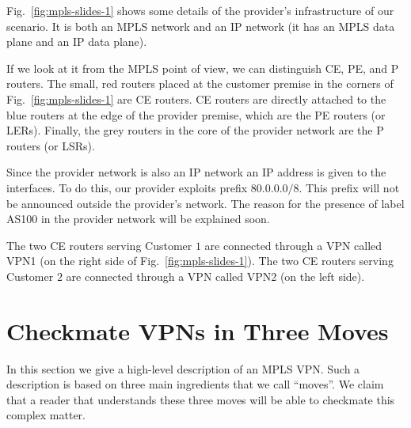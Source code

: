 \documentclass{article}
\begin{document}
\begin{shaded}
\noindent
Fig.~\ref{fig:mpls-slides-1} shows some details of the provider's infrastructure of our
scenario. It is
both an MPLS network and an IP network (it has an MPLS data plane and an IP data
plane).

If we look at it from the MPLS point of view, we can distinguish CE, PE, and P 
routers. The small, red routers placed at the customer premise in the corners 
of Fig.~\ref{fig:mpls-slides-1} are CE routers. CE routers are directly 
attached to the blue routers at the edge of the provider premise, which are the 
PE routers (or LERs). Finally, the grey routers in the core of the provider 
network are the P routers (or LSRs).

Since the provider network is also an IP network an IP address is given to the interfaces.
To do this, our provider exploits prefix $80.0.0.0/8$. This prefix will not be announced
outside the provider's network. The reason for the presence of label AS100
in the provider network will be explained soon.

The two CE routers serving Customer $1$ are connected through a VPN called VPN1 
(on the right side of Fig.~\ref{fig:mpls-slides-1}). The two CE routers serving 
Customer $2$ are connected through a VPN called VPN2 (on the left side). 
\end{shaded}

\section{Checkmate VPNs in Three Moves}\label{se:overview}

In this section we give a high-level description of an MPLS VPN. Such a description is
based on three main ingredients that we call ``moves''. We claim that a reader that
understands these three moves will be able to checkmate this complex matter.
\end{document}
